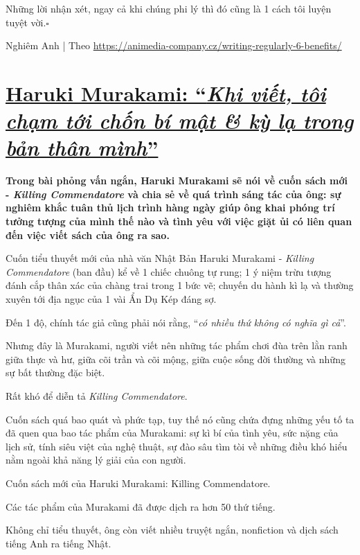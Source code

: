 \documentclass{book}
\numberwithin{equation}{section}
\begin{document}
Những lời nhận xét, ngay cả khi chúng phi lý thì đó cũng là 1 cách tôi luyện tuyệt vời.\hfill$\square$

\begin{flushright}
    Nghiêm Anh | Theo \url{https://animedia-company.cz/writing-regularly-6-benefits/}
\end{flushright}


\chapter{\href{http://tramdoc.vn/tin-tuc/haruki-murakami-khi-viet-toi-cham-toi-chon-bi-mat-va-ki-la-trong-ban-than-minh-nZNYLW.html}{Haruki Murakami: ``\textit{Khi viết, tôi chạm tới chốn bí mật \& kỳ lạ trong bản thân mình}''}}

\textbf{Trong bài phỏng vấn ngắn, Haruki Murakami sẽ nói về cuốn sách mới - \textit{Killing Commendatore} và chia sẻ về quá trình sáng tác của ông: sự nghiêm khắc tuân thủ lịch trình hàng ngày giúp ông khai phóng trí tưởng tượng của mình thế nào và tình yêu với việc giặt ủi có liên quan đến việc viết sách của ông ra sao.}

%
Cuốn tiểu thuyết mới của nhà văn Nhật Bản Haruki Murakami - \textit{Killing Commendatore} (ban đầu) kể về 1 chiếc chuông tự rung; 1 ý niệm trừu tượng đánh cắp thân xác của chàng trai trong 1 bức vẽ; chuyến du hành kì lạ và thường xuyên tới địa ngục của 1 vài Ẩn Dụ Kép đáng sợ.

Đến 1 độ, chính tác giả cũng phải nói rằng, ``\textit{có nhiều thứ không có nghĩa gì cả}''.

%
Nhưng đây là Murakami, người viết nên những tác phẩm chơi đùa trên lằn ranh giữa thực và hư, giữa cõi trần và cõi mộng, giữa cuộc sống đời thường và những sự bất thường đặc biệt.

Rất khó để diễn tả \textit{Killing Commendatore}.

Cuốn sách quá bao quát và phức tạp, tuy thế nó cũng chứa đựng những yếu tố ta đã quen qua bao tác phẩm của Murakami: sự kì bí của tình yêu, sức nặng của lịch sử, tính siêu việt của nghệ thuật, sự đào sâu tìm tòi về những điều khó hiểu nằm ngoài khả năng lý giải của con người.

\textsf{Cuốn sách mới của Haruki Murakami: Killing Commendatore.}

Các tác phẩm của Murakami đã được dịch ra hơn 50 thứ tiếng.

Không chỉ tiểu thuyết, ông còn viết nhiều truyệt ngắn, nonfiction và dịch sách tiếng Anh ra tiếng Nhật.
\end{document}
